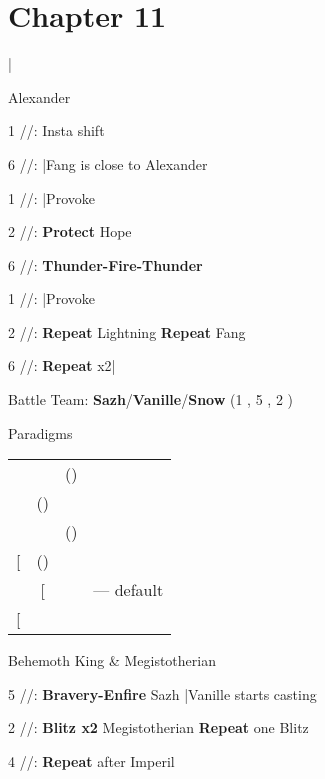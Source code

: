 \section{Chapter 11}

\begin{mainlist}
	\item {}|
\end{mainlist}
\begin{fight}{Alexander}
	\item [1] \rav/\med/\sen: Insta shift
	\item [6] \rav/\rav/\com: |Fang is close to Alexander
	\item [1] \rav/\med/\sen: |Provoke
	\item [2] \syn/\med/\sen: \textbf{Protect} Hope
	\item [6] \rav/\rav/\com: \textbf{Thunder-Fire-Thunder}
	\item [1] \rav/\med/\sen: |Provoke
	\item [2] \syn/\med/\sen: \textbf{Repeat} Lightning \to \textbf{Repeat} Fang
	\item [6] \rav/\rav/\com: \textbf{Repeat} x2|
\end{fight}
\begin{menu}
	\item Battle Team: \textbf{Sazh}/\textbf{Vanille}/\textbf{Snow} (1 , 5 , 2 )
	\item Paradigms
	\begin{tabular}{cccl}
		\com       & \med       & (\com) &             \\
		\com       & (\sab)     & \rav   &             \\
		\syn       & \med       & (\com) &             \\
		{[}\com{]} & (\sab)     & \com   &             \\
		\syn       & {[}\sab{]} & \com   & --- default \\
		{[}\com{]} & \rav       & \com   &
	\end{tabular}
\end{menu}
\begin{fight}{Behemoth King \& Megistotherian}
	\item [5] \syn/\sab/\com: \textbf{Bravery-Enfire} Sazh |Vanille starts casting
	\item [2] \com/\sab/\rav: \textbf{Blitz x2} Megistotherian \to \textbf{Repeat} one Blitz
	\item [4] \com/\sab/\com: \textbf{Repeat} after Imperil
\end{fight}
